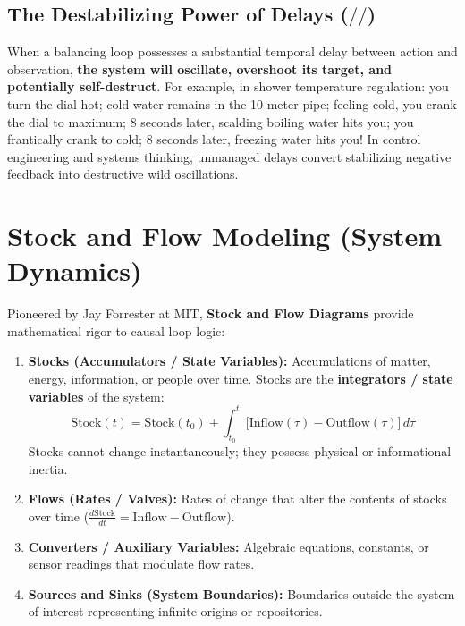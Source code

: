 \subsection{The Destabilizing Power of Delays \texorpdfstring{($/\!/$)}{(//)}}
When a balancing loop possesses a substantial temporal delay between action and observation, \textbf{the system will oscillate, overshoot its target, and potentially self-destruct}. 
For example, in shower temperature regulation: you turn the dial hot; cold water remains in the 10-meter pipe; feeling cold, you crank the dial to maximum; 8 seconds later, scalding boiling water hits you; you frantically crank to cold; 8 seconds later, freezing water hits you! In control engineering and systems thinking, unmanaged delays convert stabilizing negative feedback into destructive wild oscillations.

\section{Stock and Flow Modeling (System Dynamics)}
\label{sec:stock_flow}

Pioneered by Jay Forrester at MIT, \textbf{Stock and Flow Diagrams} provide mathematical rigor to causal loop logic:
\begin{enumerate}[leftmargin=2em]
    \item \textbf{Stocks (Accumulators / State Variables):} Accumulations of matter, energy, information, or people over time. Stocks are the \textbf{integrators / state variables} of the system:
    \begin{equation}
        \text{Stock}(t) = \text{Stock}(t_0) + \int_{t_0}^t \Big[ \text{Inflow}(\tau) - \text{Outflow}(\tau) \Big] \, d\tau
    \end{equation}
    Stocks cannot change instantaneously; they possess physical or informational inertia.
    \item \textbf{Flows (Rates / Valves):} Rates of change that alter the contents of stocks over time ($\frac{d\text{Stock}}{dt} = \text{Inflow} - \text{Outflow}$).
    \item \textbf{Converters / Auxiliary Variables:} Algebraic equations, constants, or sensor readings that modulate flow rates.
    \item \textbf{Sources and Sinks (System Boundaries):} Boundaries outside the system of interest representing infinite origins or repositories.
\end{enumerate}

